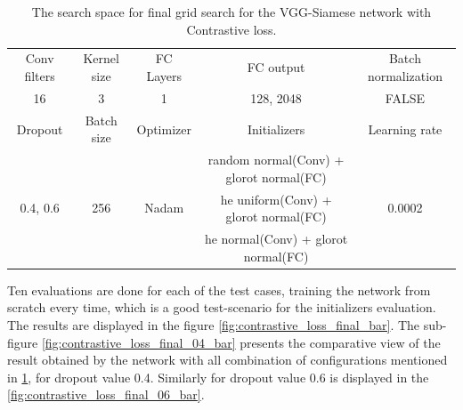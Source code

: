 \begin{table}
 \centering
\caption[Final grid search space VGG-Siamese network.]{The search space for final grid search for the VGG-Siamese network with Contrastive loss.}
\resizebox{\textwidth}{!}
{\begin{tabular}{|c | c| c| c| c|} 
\hline\hline
 \rowcolor{lightgrey}
 Conv filters & Kernel size & FC Layers & FC output & Batch normalization \\ 
  16 & 3 & 1 & 128, 2048 & FALSE\\ 
 \hline
 \rowcolor{lightgrey}
 Dropout & Batch size & Optimizer & Initializers & Learning rate\\[0.5ex]
 \hline
 &&& random normal(Conv) + glorot normal(FC) & \\[0.5ex]
 0.4, 0.6 & 256 & Nadam & he uniform(Conv) + glorot normal(FC) &  0.0002\\
 &&& he normal(Conv) + glorot normal(FC) & \\
 \hline \hline
\end{tabular}}
\label{table:final_search_space_contrastive}
\end{table} 

Ten evaluations are done for each of the test cases, training the network from scratch every time, which is a good test-scenario for the initializers evaluation. The results are displayed in the figure \ref{fig:contrastive_loss_final_bar}.
The sub-figure \ref{fig:contrastive_loss_final_04_bar} presents the comparative view of the result obtained by the network with all combination of configurations mentioned in \ref{table:final_search_space_contrastive}, for dropout value 0.4.
Similarly for dropout value 0.6 is displayed in the \ref{fig:contrastive_loss_final_06_bar}.

